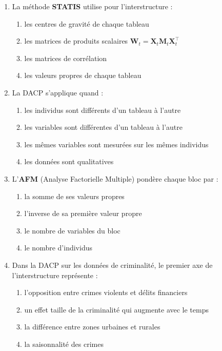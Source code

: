 \documentclass[a4paper,11pt]{article}
\begin{document}
\begin{enumerate}
    \item La méthode \textbf{STATIS} utilise pour l'interstructure :
    \begin{enumerate}
        \item les centres de gravité de chaque tableau
        \item les matrices de produits scalaires $\mathbf{W}_t = \mathbf{X}_t \mathbf{M}_t \mathbf{X}_t^\top$
        \item les matrices de corrélation
        \item les valeurs propres de chaque tableau
    \end{enumerate}

    \item La DACP s'applique quand :
    \begin{enumerate}
        \item les individus sont différents d'un tableau à l'autre
        \item les variables sont différentes d'un tableau à l'autre
        \item les mêmes variables sont mesurées sur les mêmes individus
        \item les données sont qualitatives
    \end{enumerate}

    \item L'\textbf{AFM} (Analyse Factorielle Multiple) pondère chaque bloc par :
    \begin{enumerate}
        \item la somme de ses valeurs propres
        \item l'inverse de sa première valeur propre
        \item le nombre de variables du bloc
        \item le nombre d'individus
    \end{enumerate}

    \item Dans la DACP sur les données de criminalité, le premier axe de l'interstructure représente :
    \begin{enumerate}
        \item l'opposition entre crimes violents et délits financiers
        \item un effet taille de la criminalité qui augmente avec le temps
        \item la différence entre zones urbaines et rurales
        \item la saisonnalité des crimes
    \end{enumerate}


\end{enumerate}
\end{document}
